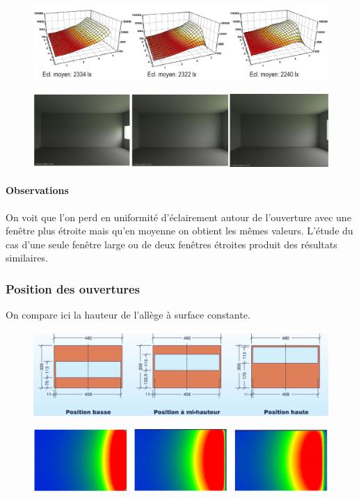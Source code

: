 \documentclass[11pt]{report}
\begin{document}
\begin{figure}[h]
\centering
\includegraphics[width=\linewidth]{gra2}
\end{figure}

\begin{figure}[h]
\centering
\includegraphics[width=\linewidth]{pho2}
\end{figure}

\paragraph{Observations} On voit que l'on perd en uniformité d'éclairement autour de l'ouverture avec une fenêtre plus étroite mais qu'en moyenne on obtient les mêmes valeurs. L'étude du cas d'une seule fenêtre large ou de deux fenêtres étroites produit des résultats similaires.






\newpage
\subsubsection{Position des ouvertures}
On compare ici la hauteur de l'allège à surface constante.

\begin{figure}[h]
\centering
\includegraphics[width=0.6\linewidth]{hau}
\end{figure}

\begin{figure}[h]
\centering
\includegraphics[width=\linewidth]{gra3}
\end{figure}
\end{document}
